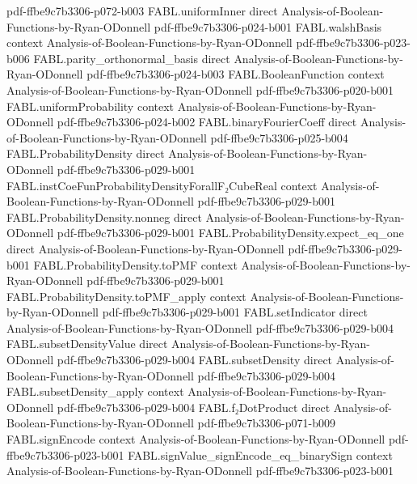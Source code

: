 \begin{theorem}
  {pdf-ffbe9c7b3306-p072-b003}
\proofstep
  {FABL.uniformInner}
  {direct}
  {Analysis-of-Boolean-Functions-by-Ryan-ODonnell}
  {pdf-ffbe9c7b3306-p024-b001}
\proofstep
  {FABL.walshBasis}
  {context}
  {Analysis-of-Boolean-Functions-by-Ryan-ODonnell}
  {pdf-ffbe9c7b3306-p023-b006}
\proofstep
  {FABL.parity_orthonormal_basis}
  {direct}
  {Analysis-of-Boolean-Functions-by-Ryan-ODonnell}
  {pdf-ffbe9c7b3306-p024-b003}
\proofstep
  {FABL.BooleanFunction}
  {context}
  {Analysis-of-Boolean-Functions-by-Ryan-ODonnell}
  {pdf-ffbe9c7b3306-p020-b001}
\proofstep
  {FABL.uniformProbability}
  {context}
  {Analysis-of-Boolean-Functions-by-Ryan-ODonnell}
  {pdf-ffbe9c7b3306-p024-b002}
\proofstep
  {FABL.binaryFourierCoeff}
  {direct}
  {Analysis-of-Boolean-Functions-by-Ryan-ODonnell}
  {pdf-ffbe9c7b3306-p025-b004}
\proofstep
  {FABL.ProbabilityDensity}
  {direct}
  {Analysis-of-Boolean-Functions-by-Ryan-ODonnell}
  {pdf-ffbe9c7b3306-p029-b001}
\proofstep
  {FABL.instCoeFunProbabilityDensityForallF₂CubeReal}
  {context}
  {Analysis-of-Boolean-Functions-by-Ryan-ODonnell}
  {pdf-ffbe9c7b3306-p029-b001}
\proofstep
  {FABL.ProbabilityDensity.nonneg}
  {direct}
  {Analysis-of-Boolean-Functions-by-Ryan-ODonnell}
  {pdf-ffbe9c7b3306-p029-b001}
\proofstep
  {FABL.ProbabilityDensity.expect_eq_one}
  {direct}
  {Analysis-of-Boolean-Functions-by-Ryan-ODonnell}
  {pdf-ffbe9c7b3306-p029-b001}
\proofstep
  {FABL.ProbabilityDensity.toPMF}
  {context}
  {Analysis-of-Boolean-Functions-by-Ryan-ODonnell}
  {pdf-ffbe9c7b3306-p029-b001}
\proofstep
  {FABL.ProbabilityDensity.toPMF_apply}
  {context}
  {Analysis-of-Boolean-Functions-by-Ryan-ODonnell}
  {pdf-ffbe9c7b3306-p029-b001}
\proofstep
  {FABL.setIndicator}
  {direct}
  {Analysis-of-Boolean-Functions-by-Ryan-ODonnell}
  {pdf-ffbe9c7b3306-p029-b004}
\proofstep
  {FABL.subsetDensityValue}
  {direct}
  {Analysis-of-Boolean-Functions-by-Ryan-ODonnell}
  {pdf-ffbe9c7b3306-p029-b004}
\proofstep
  {FABL.subsetDensity}
  {direct}
  {Analysis-of-Boolean-Functions-by-Ryan-ODonnell}
  {pdf-ffbe9c7b3306-p029-b004}
\proofstep
  {FABL.subsetDensity_apply}
  {context}
  {Analysis-of-Boolean-Functions-by-Ryan-ODonnell}
  {pdf-ffbe9c7b3306-p029-b004}
\proofstep
  {FABL.f₂DotProduct}
  {direct}
  {Analysis-of-Boolean-Functions-by-Ryan-ODonnell}
  {pdf-ffbe9c7b3306-p071-b009}
\proofstep
  {FABL.signEncode}
  {context}
  {Analysis-of-Boolean-Functions-by-Ryan-ODonnell}
  {pdf-ffbe9c7b3306-p023-b001}
\proofstep
  {FABL.signValue_signEncode_eq_binarySign}
  {context}
  {Analysis-of-Boolean-Functions-by-Ryan-ODonnell}
  {pdf-ffbe9c7b3306-p023-b001}
\proofstep

\end{theorem}
